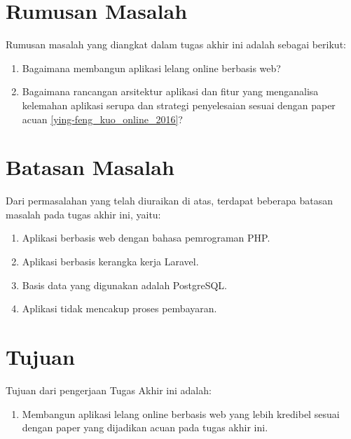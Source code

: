   \section{Rumusan Masalah}
    Rumusan masalah yang diangkat dalam tugas akhir ini adalah sebagai berikut: 
    \begin{enumerate}
      \item Bagaimana membangun aplikasi lelang online berbasis web?
      \item Bagaimana rancangan arsitektur aplikasi dan fitur yang menganalisa kelemahan aplikasi serupa dan strategi penyelesaian sesuai dengan paper acuan \ref{ying-feng_kuo_online_2016}?
    \end{enumerate}

  \section{Batasan Masalah}
  	\label{batasan-masalah}
    Dari permasalahan yang telah diuraikan di atas, terdapat beberapa batasan masalah pada tugas akhir ini, yaitu:
    \begin{enumerate}
      \item Aplikasi berbasis web dengan bahasa pemrograman PHP.
      \item Aplikasi berbasis kerangka kerja Laravel.
      \item Basis data yang digunakan adalah PostgreSQL.
      \item Aplikasi tidak mencakup proses pembayaran.
    \end{enumerate}

  \section{Tujuan}
  \label{tujuan}
    Tujuan dari pengerjaan Tugas Akhir ini adalah: 
    \begin{enumerate}
      \item Membangun aplikasi lelang online berbasis web yang lebih kredibel sesuai dengan paper yang dijadikan acuan pada tugas akhir ini. 
    \end{enumerate}
    
    
